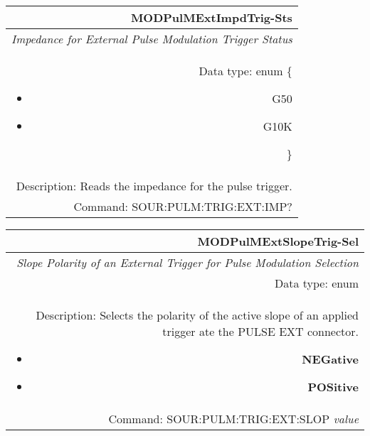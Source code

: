 \documentclass[openany]{article}
\begin{document}
		\begin{tabular}{N}
			\hline
			\bfseries MODPulMExtImpdTrig-Sts \\ \hline
			\emph{Impedance for External Pulse Modulation Trigger Status} \\
			Data type: enum \{\begin{itemize}[noitemsep]
				\small
				\item[] G50
				\item[] G10K
			\end{itemize}\} \\ 
			Description: Reads the impedance for the pulse trigger. \\
			Command: SOUR:PULM:TRIG:EXT:IMP? \\

		\end{tabular}
%
		\begin{tabular}{N}
			\hline
			\bfseries MODPulMExtSlopeTrig-Sel \\ \hline
			\emph{Slope Polarity of an External Trigger for Pulse Modulation Selection} \\
			Data type: enum \\  
			Description: Selects the polarity of the active slope of an applied trigger ate the PULSE EXT connector. \begin{itemize}[noitemsep]
				\small
				\item[] \textbf{NEGative}
                                \item[] \textbf{POSitive}
			\end{itemize} \\
			Command: SOUR:PULM:TRIG:EXT:SLOP \emph{value} \\

		\end{tabular}
\end{document}
